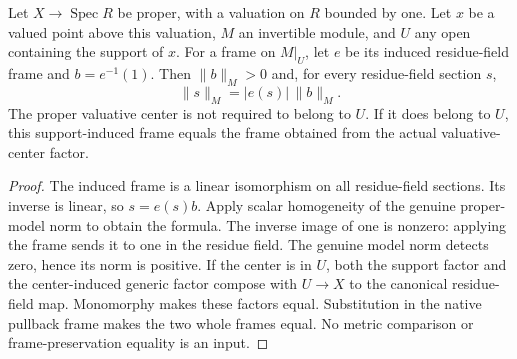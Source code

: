\begin{theorem}\label{thm:scheme-support-frame-model-norm}
\leanok
Let $X\to\operatorname{Spec}R$ be proper, with a valuation on $R$
bounded by one. Let $x$ be a valued point above this valuation, $M$
an invertible module, and $U$ any open containing the support of $x$.
For a frame on $M|_U$, let $e$ be its induced residue-field frame and
$b=e^{-1}(1)$. Then $\|b\|_M>0$ and, for every residue-field section $s$,
\[
 \|s\|_M=|e(s)|\,\|b\|_M.
\]
The proper valuative center is not required to belong to $U$.
If it does belong to $U$, this support-induced frame equals the
frame obtained from the actual valuative-center factor.
\end{theorem}
\begin{proof}
The induced frame is a linear isomorphism on all residue-field
sections. Its inverse is linear, so $s=e(s)b$. Apply scalar
homogeneity of the genuine proper-model norm to obtain the formula.
The inverse image of one is nonzero: applying the frame sends it to
one in the residue field. The genuine model norm detects zero, hence
its norm is positive. If the center is in $U$, both the support
factor and the center-induced generic factor compose with $U\to X$
to the canonical residue-field map. Monomorphy makes these factors
equal. Substitution in the native pullback frame makes the two whole
frames equal. No metric comparison or frame-preservation equality is
an input.
\end{proof}
